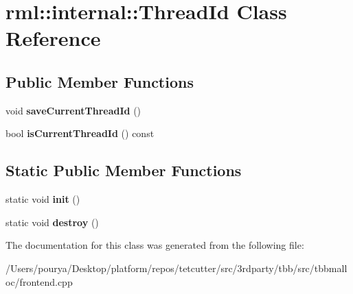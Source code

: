 \hypertarget{classrml_1_1internal_1_1ThreadId}{}\section{rml\+:\+:internal\+:\+:Thread\+Id Class Reference}
\label{classrml_1_1internal_1_1ThreadId}
\subsection*{Public Member Functions}
\begin{DoxyCompactItemize}
\item 
\hypertarget{classrml_1_1internal_1_1ThreadId_a65f790edd2ccdd5ba1a10023d837373c}{}void {\bfseries save\+Current\+Thread\+Id} ()\label{classrml_1_1internal_1_1ThreadId_a65f790edd2ccdd5ba1a10023d837373c}

\item 
\hypertarget{classrml_1_1internal_1_1ThreadId_a3a1b9e6caa478302b0e2a8ef4335ce71}{}bool {\bfseries is\+Current\+Thread\+Id} () const \label{classrml_1_1internal_1_1ThreadId_a3a1b9e6caa478302b0e2a8ef4335ce71}

\end{DoxyCompactItemize}
\subsection*{Static Public Member Functions}
\begin{DoxyCompactItemize}
\item 
\hypertarget{classrml_1_1internal_1_1ThreadId_a073df561a683fb91f9cc6325f0f6f53f}{}static void {\bfseries init} ()\label{classrml_1_1internal_1_1ThreadId_a073df561a683fb91f9cc6325f0f6f53f}

\item 
\hypertarget{classrml_1_1internal_1_1ThreadId_ad5e9ae4af22d11ac614a530cdc3ad02f}{}static void {\bfseries destroy} ()\label{classrml_1_1internal_1_1ThreadId_ad5e9ae4af22d11ac614a530cdc3ad02f}

\end{DoxyCompactItemize}


The documentation for this class was generated from the following file\+:\begin{DoxyCompactItemize}
\item 
/\+Users/pourya/\+Desktop/platform/repos/tetcutter/src/3rdparty/tbb/src/tbbmalloc/frontend.\+cpp\end{DoxyCompactItemize}
